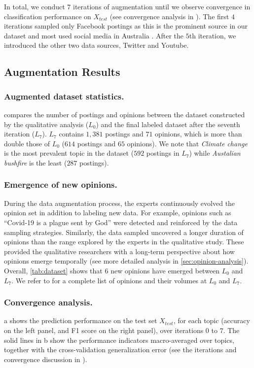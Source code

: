 In total, we conduct $7$ iterations of augmentation until we observe convergence in classification performance on $X_{test}$ (see convergence analysis in ).
The first $4$ iterations sampled only Facebook postings as this is the prominent source in our dataset and most used social media in Australia \citep{newman2020reuters}.
After the $5$th iteration, we introduced the other two data sources, Twitter and Youtube.


\subsection{Augmentation Results}
\label{subsec:augmentation-results}

\subsubsection{Augmented dataset statistics.} 
 compares the number of postings and opinions between the dataset constructed by the qualitative analysis ($L_0$) and the final labeled dataset after the seventh iteration ($L_7$).
$L_7$ contains $1,381$ postings and $71$ opinions, which is more than double those of $L_0$ ($614$ postings and $65$ opinions). 
We note that \textit{Climate change} is the most prevalent topic in the dataset ($592$ postings in $L_{7}$) while \textit{Austalian bushfire} is the least ($287$ postings).

\subsubsection{Emergence of new opinions.}
During the data augmentation process, the experts continuously evolved the opinion set in addition to labeling new data.
For example, opinions such as ``Covid-19 is a plague sent by God'' were detected and reinforced by the data sampling strategies. 
Similarly, the data sampled uncovered a longer duration of opinions than the range explored by the experts in the qualitative study.
These provided the qualitative researchers with a long-term perspective about how opinions emerge temporally (see more detailed analysis in \cref{sec:opinion-analysis}).
Overall, \cref{tab:dataset} shows that $6$ new opinions have emerged between $L_0$ and $L_7$. 
We refer to \citep{appendix} for a complete list of opinions and their volumes at $L_0$ and $L_7$.



\subsubsection{Convergence analysis.}
a shows the prediction performance on the test set $X_{test}$, for each topic (accuracy on the left panel, and F1 score on the right panel), over iterations $0$ to $7$.
The solid lines in b show the performance indicators macro-averaged over topics, together with the cross-validation generalization error (see the iterations and convergence discussion in ).

